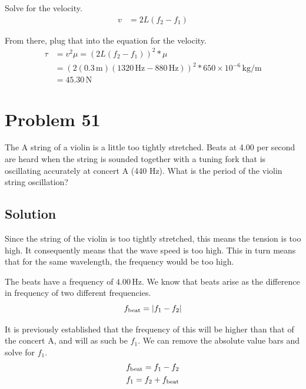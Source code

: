 \documentclass[12pt]{article}
\newcommand{\E}[1]{\times 10^{#1}}
\begin{document}
            Solve for the velocity.
            \begin{align}
                v   &=  2L(f_2 - f_1)
            \end{align}

            From there, plug that into the equation for the velocity.
            \begin{align}
                \tau    &=  v^2\mu
                    =   (2L(f_2 - f_1))^2 * \mu\\
                    &=  (2(0.3\,\unit{\meter})(1320\,\unit{\hertz} - 880\,\unit{\hertz}))^2 * 650\E{-6}\,\unit{\kilo\gram/\meter}\\
                    &=  \boxed{45.30\,\unit{\newton}}
            \end{align}

    \pagebreak
    \section{Problem 51}
        The A string of a violin is a little too tightly stretched. 
        Beats at 4.00 per second are heard when the string is sounded together with a tuning fork that is oscillating accurately at concert A (440 Hz).
        What is the period of the violin string oscillation?

        \subsection{Solution}
            Since the string of the violin is too tightly stretched, this means the tension is too high. 
            It consequently means that the wave speed is too high.
            This in turn means that for the same wavelength, the frequency would be too high.

            The beats have a frequency of $4.00\,\unit{\hertz}$.
            We know that beats arise as the difference in frequency of two different frequencies.
            \begin{equation}
                f_{\rm beat} = \left| f_1 - f_2 \right|
            \end{equation}

            It is previously established that the frequency of this will be higher than that of the concert A, and will as such be $f_1$.
            We can remove the absolute value bars and solve for $f_1$.
            \begin{gather}
                f_{\rm beat} = f_1 - f_2\\
                f_1 = f_2 + f_{\rm beat}
            \end{gather}
\end{document}
